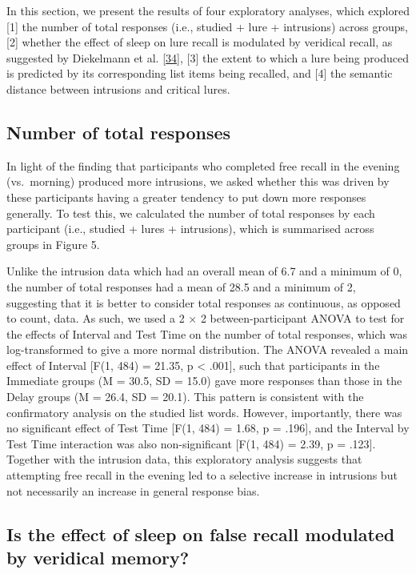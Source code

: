 \documentclass[
]{article}
\begin{document}
In this section, we present the results of four exploratory analyses, which explored {[}1{]} the number of total responses (i.e., studied + lure + intrusions) across groups, {[}2{]} whether the effect of sleep on lure recall is modulated by veridical recall, as suggested by Diekelmann et al. {[}\protect\hyperlink{ref-diekelmann2010a}{34}{]}, {[}3{]} the extent to which a lure being produced is predicted by its corresponding list items being recalled, and {[}4{]} the semantic distance between intrusions and critical lures.

\hypertarget{number-of-total-responses}{%
\subsection{Number of total responses}\label{number-of-total-responses}}

In light of the finding that participants who completed free recall in the evening (vs.~morning) produced more intrusions, we asked whether this was driven by these participants having a greater tendency to put down more responses generally. To test this, we calculated the number of total responses by each participant (i.e., studied + lures + intrusions), which is summarised across groups in Figure 5.

Unlike the intrusion data which had an overall mean of 6.7 and a minimum of 0, the number of total responses had a mean of 28.5 and a minimum of 2, suggesting that it is better to consider total responses as continuous, as opposed to count, data. As such, we used a 2 \(\times\) 2 between-participant ANOVA to test for the effects of Interval and Test Time on the number of total responses, which was log-transformed to give a more normal distribution. The ANOVA revealed a main effect of Interval {[}F(1, 484) = 21.35, p \textless{} .001{]}, such that participants in the Immediate groups (M = 30.5, SD = 15.0) gave more responses than those in the Delay groups (M = 26.4, SD = 20.1). This pattern is consistent with the confirmatory analysis on the studied list words. However, importantly, there was no significant effect of Test Time {[}F(1, 484) = 1.68, p = .196{]}, and the Interval by Test Time interaction was also non-significant {[}F(1, 484) = 2.39, p = .123{]}. Together with the intrusion data, this exploratory analysis suggests that attempting free recall in the evening led to a selective increase in intrusions but not necessarily an increase in general response bias.

\hypertarget{is-the-effect-of-sleep-on-false-recall-modulated-by-veridical-memory}{%
\subsection{Is the effect of sleep on false recall modulated by veridical memory?}\label{is-the-effect-of-sleep-on-false-recall-modulated-by-veridical-memory}}
\end{document}
